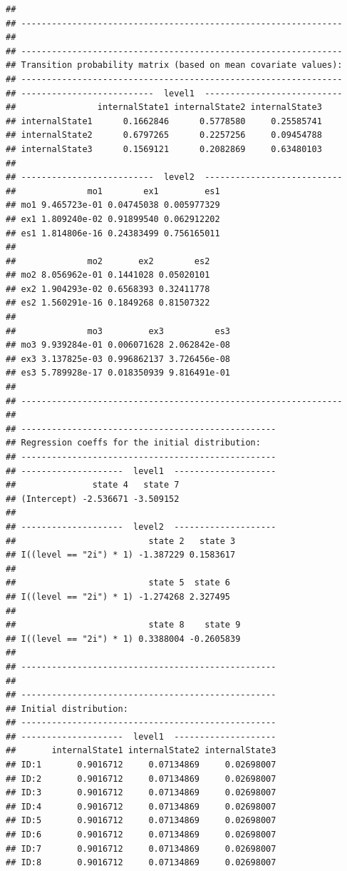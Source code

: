 \documentclass[12pt]{article}\usepackage[]{graphicx}\usepackage[]{color}
\makeatletter
\newenvironment{kframe}{%
 \def\at@end@of@kframe{}%
 \ifinner\ifhmode%
  \def\at@end@of@kframe{\end{minipage}}%
  \begin{minipage}{\columnwidth}%
 \fi\fi%
 \def\FrameCommand##1{\hskip\@totalleftmargin \hskip-\fboxsep
 \colorbox{shadecolor}{##1}\hskip-\fboxsep
     \hskip-\linewidth \hskip-\@totalleftmargin \hskip\columnwidth}%
 \MakeFramed {\advance\hsize-\width
   \@totalleftmargin\z@ \linewidth\hsize
   \@setminipage}}%
 {\par\unskip\endMakeFramed%
 \at@end@of@kframe}
\newenvironment{knitrout}{}{} %
\makeatother
\begin{document}
\begin{knitrout}
\begin{kframe}
\begin{verbatim}
## 
## ---------------------------------------------------------------
## 
## ---------------------------------------------------------------
## Transition probability matrix (based on mean covariate values):
## ---------------------------------------------------------------
## --------------------------  level1  ---------------------------
##                internalState1 internalState2 internalState3
## internalState1      0.1662846      0.5778580     0.25585741
## internalState2      0.6797265      0.2257256     0.09454788
## internalState3      0.1569121      0.2082869     0.63480103
## 
## --------------------------  level2  ---------------------------
##              mo1        ex1         es1
## mo1 9.465723e-01 0.04745038 0.005977329
## ex1 1.809240e-02 0.91899540 0.062912202
## es1 1.814806e-16 0.24383499 0.756165011
## 
##              mo2       ex2        es2
## mo2 8.056962e-01 0.1441028 0.05020101
## ex2 1.904293e-02 0.6568393 0.32411778
## es2 1.560291e-16 0.1849268 0.81507322
## 
##              mo3         ex3          es3
## mo3 9.939284e-01 0.006071628 2.062842e-08
## ex3 3.137825e-03 0.996862137 3.726456e-08
## es3 5.789928e-17 0.018350939 9.816491e-01
## 
## ---------------------------------------------------------------
## 
## --------------------------------------------------
## Regression coeffs for the initial distribution:
## --------------------------------------------------
## --------------------  level1  --------------------
##               state 4   state 7
## (Intercept) -2.536671 -3.509152
## 
## --------------------  level2  --------------------
##                          state 2   state 3
## I((level == "2i") * 1) -1.387229 0.1583617
## 
##                          state 5  state 6
## I((level == "2i") * 1) -1.274268 2.327495
## 
##                          state 8    state 9
## I((level == "2i") * 1) 0.3388004 -0.2605839
## 
## --------------------------------------------------
## 
## --------------------------------------------------
## Initial distribution:
## --------------------------------------------------
## --------------------  level1  --------------------
##       internalState1 internalState2 internalState3
## ID:1       0.9016712     0.07134869     0.02698007
## ID:2       0.9016712     0.07134869     0.02698007
## ID:3       0.9016712     0.07134869     0.02698007
## ID:4       0.9016712     0.07134869     0.02698007
## ID:5       0.9016712     0.07134869     0.02698007
## ID:6       0.9016712     0.07134869     0.02698007
## ID:7       0.9016712     0.07134869     0.02698007
## ID:8       0.9016712     0.07134869     0.02698007

\end{verbatim}
\end{kframe}
\end{knitrout}
\end{document}
